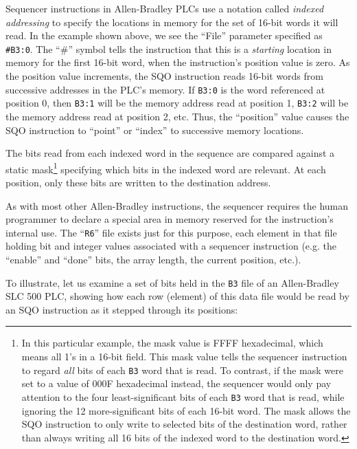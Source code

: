 Sequencer instructions in Allen-Bradley PLCs use a notation called \textit{indexed addressing} to specify the locations in memory for the set of 16-bit words it will read.  In the example shown above, we see the ``File'' parameter specified as \texttt{\#B3:0}.  The ``\#'' symbol tells the instruction that this is a \textit{starting} location in memory for the first 16-bit word, when the instruction's position value is zero.  As the position value increments, the SQO instruction reads 16-bit words from successive addresses in the PLC's memory.  If \texttt{B3:0} is the word referenced at position 0, then \texttt{B3:1} will be the memory address read at position 1, \texttt{B3:2} will be the memory address read at position 2, etc.  Thus, the ``position'' value causes the SQO instruction to ``point'' or ``index'' to successive memory locations.

\vskip 10pt

The bits read from each indexed word in the sequence are compared against a static mask\footnote{In this particular example, the mask value is FFFF hexadecimal, which means all 1's in a 16-bit field.  This mask value tells the sequencer instruction to regard \textit{all} bits of each \texttt{B3} word that is read.  To contrast, if the mask were set to a value of 000F hexadecimal instead, the sequencer would only pay attention to the four least-significant bits of each \texttt{B3} word that is read, while ignoring the 12 more-significant bits of each 16-bit word.  The mask allows the SQO instruction to only write to selected bits of the destination word, rather than always writing all 16 bits of the indexed word to the destination word.} specifying which bits in the indexed word are relevant.  At each position, only these bits are written to the destination address.

As with most other Allen-Bradley instructions, the sequencer requires the human programmer to declare a special area in memory reserved for the instruction's internal use.  The ``\texttt{R6}'' file exists just for this purpose, each element in that file holding bit and integer values associated with a sequencer instruction (e.g. the ``enable'' and ``done'' bits, the array length, the current position, etc.).

\filbreak

To illustrate, let us examine a set of bits held in the \texttt{B3} file of an Allen-Bradley SLC 500 PLC, showing how each row (element) of this data file would be read by an SQO instruction as it stepped through its positions:

